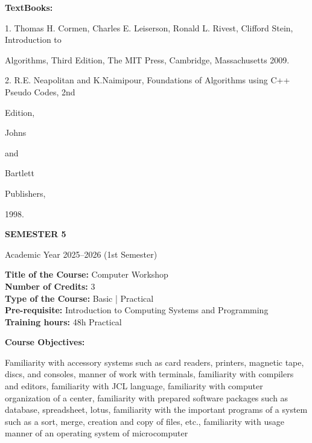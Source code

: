 \documentclass[12pt,a4paper]{article}
\begin{document}
\textbf{TextBooks:}\par\vspace{2pt}
1. Thomas H. Cormen, Charles E. Leiserson, Ronald L. Rivest, Clifford Stein, Introduction to\par
Algorithms, Third Edition, The MIT Press, Cambridge, Massachusetts 2009.\par
2. R.E. Neapolitan and K.Naimipour, Foundations of Algorithms using C++ Pseudo Codes, 2nd\par
Edition,\par
Johns\par
and\par
Bartlett\par
Publishers,\par
1998.\par
\vspace{4pt}

\newpage
\vspace*{\fill}
\begin{center}
  {\fontsize{28pt}{34pt}\selectfont \textbf{SEMESTER 5}}\par\vspace{12pt}
  {\fontsize{13pt}{17pt}\selectfont Academic Year 2025–2026 (1st Semester)}
\end{center}
\vspace*{\fill}

\newpage
\textbf{Title of the Course:} Computer Workshop\\
\textbf{Number of Credits:} 3\\
\textbf{Type of the Course:} Basic | Practical\\
\textbf{Pre-requisite:} Introduction to Computing Systems and Programming\\
\textbf{Training hours:} 48h Practical\par\vspace{4pt}
\textbf{Course Objectives:}\par\vspace{2pt}
Familiarity with accessory systems such as card readers, printers, magnetic tape, discs, and
consoles, manner of work with terminals, familiarity with compilers and editors, familiarity with
JCL language, familiarity with computer organization of a center, familiarity with prepared
software packages such as database, spreadsheet, lotus, familiarity with the important programs of
a system such as a sort, merge, creation and copy of files, etc., familiarity with usage manner of
an operating system of microcomputer\par\vspace{4pt}
\end{document}
